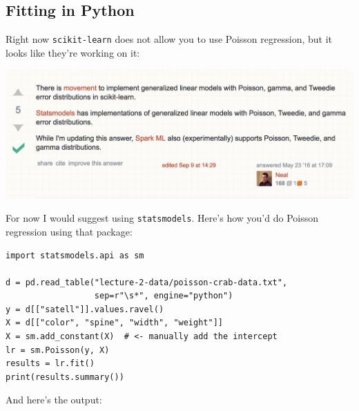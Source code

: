 \subsection*{Fitting in Python}

\noindent Right now \texttt{scikit-learn} does not allow you to use Poisson regression, but it looks like they're working on it:

\begin{center}
\includegraphics[width=\textwidth]{img/l02-stack-overflow-poisson-reg.png}
\end{center}

\noindent For now I would suggest using \texttt{statsmodels}. Here's how you'd do Poisson regression using that package:

{\small
\begin{verbatim}
import statsmodels.api as sm

d = pd.read_table("lecture-2-data/poisson-crab-data.txt", 
                  sep=r"\s*", engine="python")
y = d[["satell"]].values.ravel()
X = d[["color", "spine", "width", "weight"]]
X = sm.add_constant(X)  # <- manually add the intercept
lr = sm.Poisson(y, X)
results = lr.fit()
print(results.summary())
\end{verbatim}
}

\noindent And here's the output:

